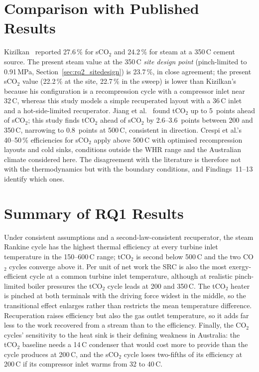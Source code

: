 \section{Comparison with Published Results}
\label{sec:lit_comparison}

Kizilkan~\cite{Kizilkan2020} reported 27.6\,\% for sCO$_2$ and 24.2\,\% for
steam at a 350\,\textdegree C cement source. The present steam value at the
350\,\textdegree C \emph{site design point} (pinch-limited to 0.91\,MPa,
Section~\ref{sec:rq2_sitedesign}) is 23.7\,\%, in close agreement; the
present sCO$_2$ value (22.2\,\% at the site, 22.7\,\% in the sweep) is lower
than Kizilkan's because his configuration is a recompression cycle with a
compressor inlet near 32\,\textdegree C, whereas this study models a simple
recuperated layout with a 36\,\textdegree C inlet and a hot-side-limited
recuperator. Jiang et al.~\cite{Jiang2023} found tCO$_2$ up to 5~points
ahead of sCO$_2$; this study finds tCO$_2$ ahead of sCO$_2$ by 2.6--3.6~points
between 200 and 350\,\textdegree C, narrowing to 0.8~points at
500\,\textdegree C, consistent in direction. Crespi et al.'s~\cite{Crespi2017}
40--50\,\% efficiencies for sCO$_2$ apply above 500\,\textdegree C with
optimised recompression layouts and cold sinks, conditions outside the WHR
range and the Australian climate considered here. The disagreement with the
literature is therefore not with the thermodynamics but with the boundary
conditions, and Findings~11--13 identify which ones.

\section{Summary of RQ1 Results}
\label{sec:rq1_summary}

Under consistent assumptions and a second-law-consistent recuperator, the
steam Rankine cycle has the highest thermal efficiency at every turbine inlet
temperature in the 150--600\,\textdegree C range; tCO$_2$ is second below
500\,\textdegree C and the two CO$_2$ cycles converge above it. Per unit of
net work the SRC is also the most exergy-efficient cycle at a common turbine
inlet temperature, although at realistic pinch-limited boiler pressures the
tCO$_2$ cycle leads at 200 and 350\,\textdegree C. The tCO$_2$ heater is
pinched at both terminals with the driving force widest in the middle, so
the transitional effect enlarges rather than restricts the mean temperature
difference. Recuperation raises efficiency but also the gas outlet
temperature, so it adds far less to the work recovered from a stream than to
the efficiency. Finally, the CO$_2$ cycles' sensitivity to the heat sink is
their defining weakness in Australia: the tCO$_2$ baseline needs a
14\,\textdegree C condenser that would cost more to provide than the cycle
produces at 200\,\textdegree C, and the sCO$_2$ cycle loses two-fifths of its
efficiency at 200\,\textdegree C if its compressor inlet warms from 32 to
40\,\textdegree C.
